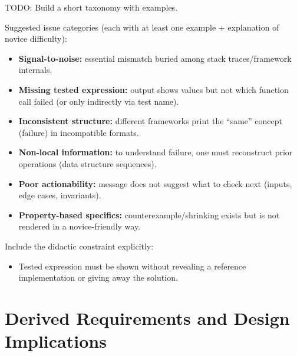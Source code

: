 \documentclass[
	bibliography=totoc,
	listof=totoc,
]{scrbook}
\begin{document}
\begin{marker}\begin{justify}
TODO: Build a short taxonomy with examples.

Suggested issue categories (each with at least one example + explanation of novice difficulty):
\begin{itemize}
    \item \textbf{Signal-to-noise:} essential mismatch buried among stack traces/framework internals.
    \item \textbf{Missing tested expression:} output shows values but not which function call failed (or only indirectly via test name).
    \item \textbf{Inconsistent structure:} different frameworks print the ``same'' concept (failure) in incompatible formats.
    \item \textbf{Non-local information:} to understand failure, one must reconstruct prior operations (data structure sequences).
    \item \textbf{Poor actionability:} message does not suggest what to check next (inputs, edge cases, invariants).
    \item \textbf{Property-based specifics:} counterexample/shrinking exists but is not rendered in a novice-friendly way.
\end{itemize}

Include the didactic constraint explicitly:
\begin{itemize}
    \item Tested expression must be shown without revealing a reference implementation or giving away the solution.
\end{itemize}
\end{justify}\end{marker}


\section{Derived Requirements and Design Implications} %
\end{document}
